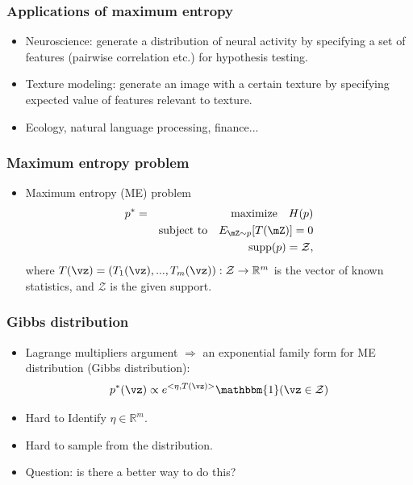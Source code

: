 \documentclass[16pt,presentation]{beamer}
\begin{document}
\begin{frame}
\frametitle{Applications of maximum entropy}
\begin{itemize}
\item \alert{Neuroscience}: generate a distribution of neural activity by specifying a set of features (pairwise correlation etc.) for hypothesis testing.
\item \alert{Texture modeling}: generate an image with a certain texture by specifying expected value of features relevant to texture.
\item Ecology, natural language processing, finance...
\end{itemize}
\end{frame}

\begin{frame}
\frametitle{Maximum entropy problem}
\begin{itemize}
\item Maximum entropy (ME) problem
\begin{eqnarray*}
p^{*} &=& \text{maximize}~~~ H(p) \\
&& \text{subject to} ~~~E_{\mZ\sim p}[T(\mZ)]=0 \nonumber\\
&& ~~~~~~~~~~~~~~~~~~\supp(p)=\mathcal{Z} \nonumber,
\end{eqnarray*}
where $T(\vz) = (T_1(\vz),...,T_m(\vz)):\mathcal{Z}\rightarrow \mathbb{R}^{m}$ is the vector of known statistics, and $\mathcal{Z}$ is the given support.
\end{itemize}
\end{frame}

\begin{frame}
\frametitle{Gibbs distribution}
\begin{itemize}
\item Lagrange multipliers argument $\Rightarrow$ an exponential family form for ME distribution (Gibbs distribution):
\[\label{curmet}
p^*(\vz) \propto e^{<\eta, T(\vz)>} \mathbbm{1}(\vz \in \mathcal{Z})
\]
\item Hard to Identify $\eta \in \mathbb{R}^m$.
\item Hard to sample from the distribution.
\item \alert{Question}: is there a better way to do this?
\end{itemize}
\end{frame}
\end{document}
